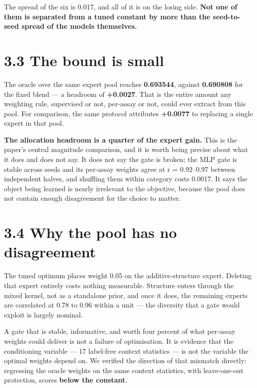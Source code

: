 \documentclass[sigconf,review,nonacm]{acmart}
\begin{document}
The spread of the six is 0.017, and all of it is on the losing side. \textbf{Not one of them is separated from
a tuned constant by more than the seed-to-seed spread of the models themselves.}

\hypertarget{the-bound-is-small}{%
\section{3.3 The bound is small}\label{the-bound-is-small}}

The oracle over the same expert pool reaches \textbf{0.693544}, against \textbf{0.690808} for the fixed blend --- a
headroom of \textbf{+0.0027}. That is the entire amount any weighting rule, supervised or not, per-assay or
not, could ever extract from this pool. For comparison, the same protocol attributes \textbf{+0.0077} to
replacing a single expert in that pool.

\textbf{The allocation headroom is a quarter of the expert gain.} This is the paper's central magnitude
comparison, and it is worth being precise about what it does and does not say. It does not say the gate
is broken; the MLP gate is stable across seeds and its per-assay weights agree at r = 0.92--0.97 between
independent halves, and shuffling them within category costs 0.0017. It says the object being learned
is nearly irrelevant to the objective, because the pool does not contain enough disagreement for the
choice to matter.

\hypertarget{why-the-pool-has-no-disagreement}{%
\section{3.4 Why the pool has no disagreement}\label{why-the-pool-has-no-disagreement}}

The tuned optimum places weight 0.05 on the additive-structure expert. Deleting that expert entirely
costs nothing measurable. Structure enters through the mixed kernel, not as a standalone prior, and once
it does, the remaining experts are correlated at 0.78 to 0.96 within a unit --- the diversity that a gate
would exploit is largely nominal.

A gate that is stable, informative, and worth four percent of what per-assay weights could deliver is
not a failure of optimisation. It is evidence that the conditioning variable --- 17 label-free context
statistics --- is not the variable the optimal weights depend on. We verified the direction of that
mismatch directly: regressing the oracle weights on the same context statistics, with leave-one-out
protection, scores \textbf{below the constant}.
\end{document}
